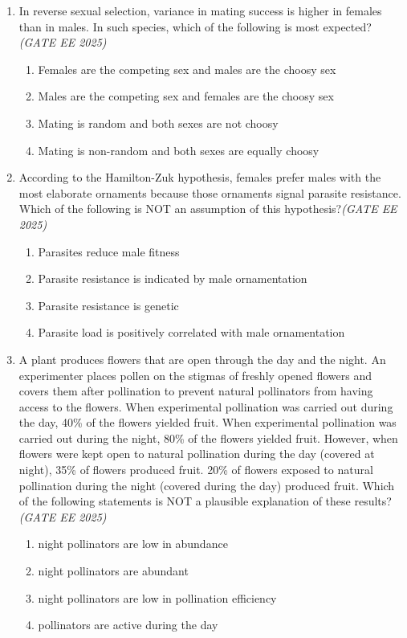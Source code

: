 \begin{enumerate}[leftmargin=*,label=\textbf{Q.\arabic*},resume]
\item In reverse sexual selection, variance in mating success is higher in females than in males. In such species, which of the following is most expected?\hfill \textit{(GATE EE 2025)}
\begin{multicols}{2}
\begin{enumerate}[label=(\Alph*)]
\item Females are the competing sex and males are the choosy sex
\item Males are the competing sex and females are the choosy sex
\item Mating is random and both sexes are not choosy
\item Mating is non-random and both sexes are equally choosy
\end{enumerate}
\end{multicols}

\item According to the Hamilton-Zuk hypothesis, females prefer males with the most elaborate ornaments because those ornaments signal parasite resistance. Which of the following is NOT an assumption of this hypothesis?\hfill \textit{(GATE EE 2025)}
\begin{multicols}{2}
\begin{enumerate}[label=(\Alph*)]
\item Parasites reduce male fitness
\item Parasite resistance is indicated by male ornamentation
\item Parasite resistance is genetic
\item Parasite load is positively correlated with male ornamentation
\end{enumerate}
\end{multicols}

\item A plant produces flowers that are open through the day and the night. An experimenter places pollen on the stigmas of freshly opened flowers and covers them after pollination to prevent natural pollinators from having access to the flowers. When experimental pollination was carried out during the day, 40\% of the flowers yielded fruit. When experimental pollination was carried out during the night, 80\% of the flowers yielded fruit. However, when flowers were kept open to natural pollination during the day (covered at night), 35\% of flowers produced fruit. 20\% of flowers exposed to natural pollination during the night (covered during the day) produced fruit. Which of the following statements is NOT a plausible explanation of these results?\hfill \textit{(GATE EE 2025)}
\begin{multicols}{2}
\begin{enumerate}[label=(\Alph*)]
\item night pollinators are low in abundance
\item night pollinators are abundant
\item night pollinators are low in pollination efficiency
\item pollinators are active during the day
\end{enumerate}
\end{multicols}


\end{enumerate}
